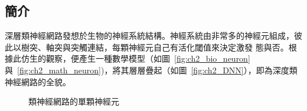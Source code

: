 \subsection{簡介}
深層類神經網路發想於生物的神經系統結構。神經系統由非常多的神經元組成，彼此以樹突、軸突與突觸連結，每顆神經元自己有活化閾值來決定激發
態與否。根據此仿生的觀察，便產生一種數學模型（如圖~\ref{fig:ch2_bio_neuron}與~\ref{fig:ch2_math_neuron})，將其層層疊起（如圖~\ref{fig:ch2_DNN}），即為深度類神經網路的全貌。
\begin{figure}[hb]
\centering
{}
\caption{類神經網路的單顆神經元}
\end{figure}

